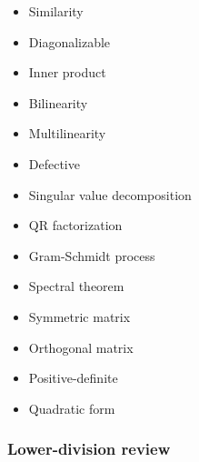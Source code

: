 \begin{itemize}
\item
  Similarity
\item
  Diagonalizable
\item
  Inner product
\item
  Bilinearity
\item
  Multilinearity
\item
  Defective
\item
  Singular value decomposition
\item
  QR factorization
\item
  Gram-Schmidt process
\item
  Spectral theorem
\item
  Symmetric matrix
\item
  Orthogonal matrix
\item
  Positive-definite
\item
  Quadratic form
\end{itemize}

\hypertarget{lower-division-review}{%
\subsubsection{Lower-division review}\label{lower-division-review}}

